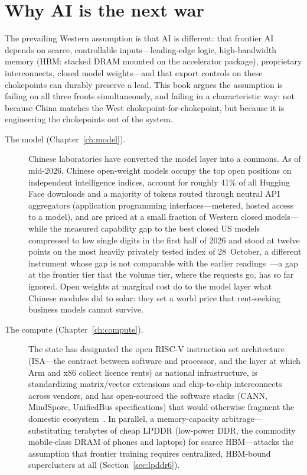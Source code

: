 \section{Why AI is the next war}

The prevailing Western assumption is that AI is different: that frontier AI depends on scarce, controllable inputs---leading-edge logic, high-bandwidth memory (HBM: stacked DRAM mounted on the accelerator package), proprietary interconnects, closed model weights---and that export controls on these chokepoints can durably preserve a lead. This book argues the assumption is failing on all three fronts simultaneously, and failing in a characteristic way: not because China matches the West chokepoint-for-chokepoint, but because it is engineering the chokepoints out of the system.

\begin{description}
  \item[The model (Chapter~\ref{ch:model}).] Chinese laboratories have converted the model layer into a commons. As of mid-2026, Chinese open-weight models occupy the top open positions on independent intelligence indices, account for roughly 41\% of all Hugging Face downloads and a majority of tokens routed through neutral API aggregators (application programming interfaces---metered, hosted access to a model), and are priced at a small fraction of Western closed models---while the measured capability gap to the best closed US models compressed to low single digits in the first half of 2026 and stood at twelve points on the most heavily privately tested index of 28~October, a different instrument whose gap is not comparable with the earlier readings~\cite{hf-spring-2026,openrouter-2026,stanford-aiindex-2026,mdl-aa-v5}---a gap at the frontier tier that the volume tier, where the requests go, has so far ignored. Open weights at marginal cost do to the model layer what Chinese modules did to solar: they set a world price that rent-seeking business models cannot survive.
  \item[The compute (Chapter~\ref{ch:compute}).] The state has designated the open RISC-V instruction set architecture (ISA---the contract between software and processor, and the layer at which Arm and x86 collect licence rents) as national infrastructure, is standardizing matrix/vector extensions and chip-to-chip interconnects across vendors, and has open-sourced the software stacks (CANN, MindSpore, UnifiedBus specifications) that would otherwise fragment the domestic ecosystem~\cite{riscv-policy,huawei-cann,huawei-ub}. In parallel, a memory-capacity arbitrage---substituting terabytes of cheap LPDDR (low-power DDR, the commodity mobile-class DRAM of phones and laptops) for scarce HBM---attacks the assumption that frontier training requires centralized, HBM-bound superclusters at all (Section~\ref{sec:lpddr6}).

\end{description}
